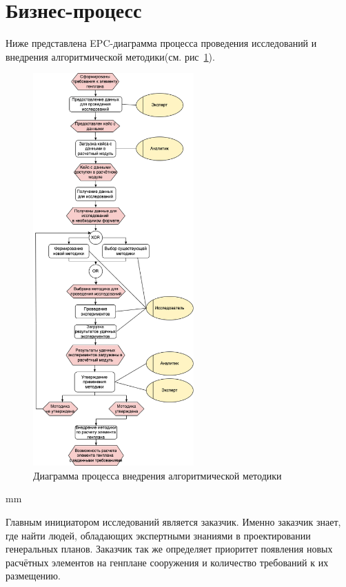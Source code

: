 \section{\Large{Бизнес-процесс}}

Ниже представлена EPC-диаграмма процесса проведения исследований и
внедрения алгоритмической методики(см. рис\ \ref{pic:analysis__usecases-epc}).

\begin{figure}[H]
	\hspace*{-2.5 cm}\includegraphics[width=0.55\textwidth, left]{analysis/pictures/usecases/epc}
	\caption{Диаграмма процесса внедрения алгоритмической методики}
	\label{pic:analysis__usecases-epc}
\end{figure}
 mm

Главным инициатором исследований является заказчик. Именно заказчик знает, где найти людей,
обладающих экспертными знаниями в проектировании генеральных планов.
Заказчик так же определяет приоритет появления
новых расчётных элементов на генплане сооружения и количество требований к их размещению.

